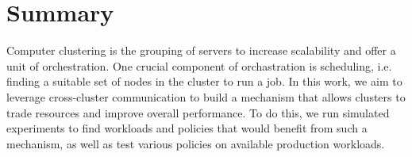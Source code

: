 \section{Summary}
Computer clustering is the grouping of servers to increase scalability and offer a unit of orchestration. 
One crucial component of orchastration is scheduling, i.e. finding a suitable set of nodes in the cluster 
to run a job. In this work, we aim to leverage cross-cluster communication to build a mechanism that allows 
clusters to trade resources and improve overall performance. 
To do this, we run simulated experiments to find workloads and policies that 
would benefit from such a mechanism, as well as test various policies on available production workloads.